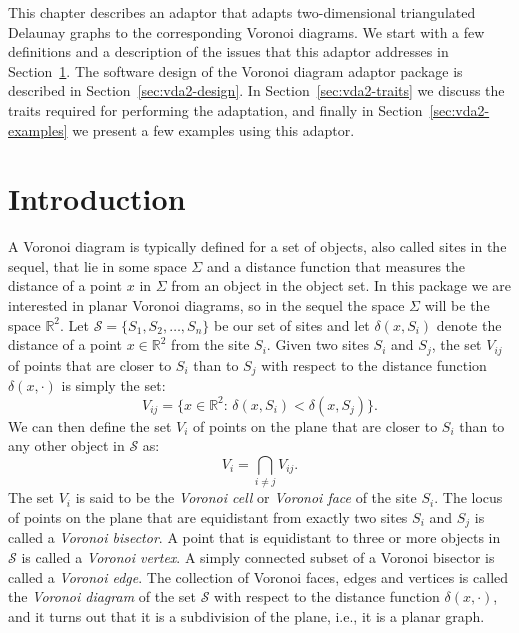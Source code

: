 
This chapter describes an adaptor that adapts two-dimensional
triangulated Delaunay graphs to the corresponding Voronoi diagrams.
We start with a few
definitions and a description of the issues that this adaptor
addresses in Section~\ref{sec:vda2-intro}. The software design
of the Voronoi diagram adaptor package is described in
Section~\ref{sec:vda2-design}. In Section~\ref{sec:vda2-traits} we
discuss the traits required for performing the adaptation, and finally
in Section~\ref{sec:vda2-examples} we present a few examples using
this adaptor.

\section{Introduction}
\label{sec:vda2-intro}

A Voronoi diagram is typically defined for a set of objects, also
called sites in the sequel, that lie in some space $\Sigma$ and a
distance function that measures the distance of a point $x$ in
$\Sigma$ from an object in the object set. In this package we are
interested in planar Voronoi diagrams, so in the sequel the space
$\Sigma$ will be the space $\mathbb{R}^2$. 
Let $\mathcal{S}=\{S_1,S_2,\ldots,S_n\}$ be our set of sites and let
$\delta(x,S_i)$ denote the distance of a point $x\in\mathbb{R}^2$ from
the site $S_i$. Given two sites $S_i$ and $S_j$, the set $V_{ij}$
of points that are closer to $S_i$ than to $S_j$ with respect to the
distance function $\delta(x,\cdot)$ is simply the set:
\[   V_{ij} = \{x\in\mathbb{R}^2:\, \delta(x,S_i)<\delta(x,S_j)\}. \]
We can then define the set $V_i$ of points on the plane that are closer to
$S_i$ than to any other object in $\mathcal{S}$ as:
\[  V_i = \bigcap_{i\neq j} V_{ij}. \]
The set $V_i$ is said to be the \emph{Voronoi cell} or \emph{Voronoi face} 
of the site $S_i$. The locus of points on the plane that are
equidistant from exactly two sites $S_i$ and $S_j$ is called a
\emph{Voronoi bisector}. A point that is equidistant to three or
more objects in $\mathcal{S}$ is called a \emph{Voronoi vertex}.
A simply connected subset of a Voronoi bisector is called a
\emph{Voronoi edge}.
The collection of Voronoi faces, edges and vertices is called the
\emph{Voronoi diagram} of the set $\mathcal{S}$ with respect to the
distance function $\delta(x,\cdot)$, and it turns out that it is a
subdivision of the plane, i.e., it is a planar graph.

